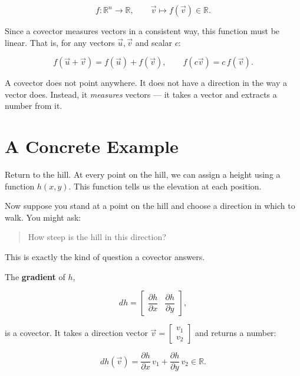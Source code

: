 \documentclass[11pt,openany]{book}
\theoremstyle{definition}
\begin{document}
\[
f: \mathbb{R}^n \to \mathbb{R}, \qquad \vec{v} \mapsto f(\vec{v}) \in \mathbb{R}.
\]

\medskip

Since a covector measures vectors in a consistent way, this function must be linear. 
That is, for any vectors $\vec{u}, \vec{v}$ and scalar $c$:

\[
f(\vec{u} + \vec{v}) = f(\vec{u}) + f(\vec{v}), \qquad 
f(c\vec{v}) = c\,f(\vec{v}).
\]

A covector does not point anywhere. It does not have a direction in the way a vector 
does. Instead, it \textit{measures} vectors --- it takes a vector and extracts a 
number from it.

\section{A Concrete Example}

Return to the hill. At every point on the hill, we can assign a height using a function 
$h(x, y)$. This function tells us the elevation at each position.

\medskip

Now suppose you stand at a point on the hill and choose a direction in which to walk. 
You might ask:

\begin{quote}
How steep is the hill in this direction?
\end{quote}

\medskip

This is exactly the kind of question a covector answers.

\medskip

The \textbf{gradient} of $h$,

\[
dh = \begin{bmatrix} \dfrac{\partial h}{\partial x} & \dfrac{\partial h}{\partial y} \end{bmatrix},
\]

is a covector. It takes a direction vector $\vec{v} = \begin{bmatrix} v_1 \\ v_2 \end{bmatrix}$ 
and returns a number:

\[
dh(\vec{v}) = \frac{\partial h}{\partial x}\,v_1 + \frac{\partial h}{\partial y}\,v_2 \in \mathbb{R}.
\]

\medskip
\end{document}
